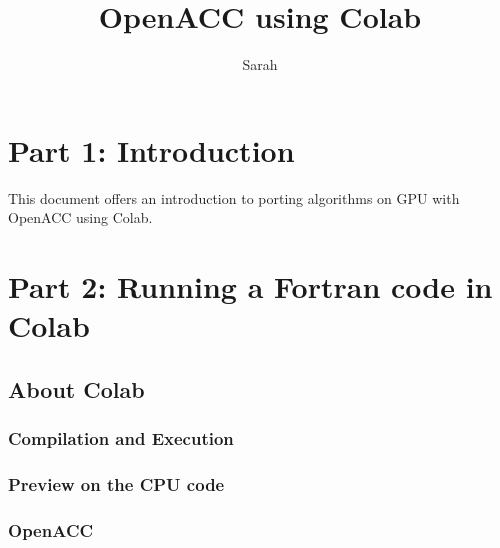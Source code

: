 \documentclass[10pt,a4paper]{article}
\author{Sarah}
\title{OpenACC using Colab}
\begin{document}
\maketitle{}
\newpage

\section{Part 1: Introduction}
This document offers an introduction to porting algorithms on GPU with OpenACC using Colab.
\section{Part 2: Running a Fortran code in Colab}
\subsection{About Colab}


\subsubsection{Compilation and Execution}

\subsubsection{Preview on the CPU code}


\subsubsection{OpenACC}
\end{document}

